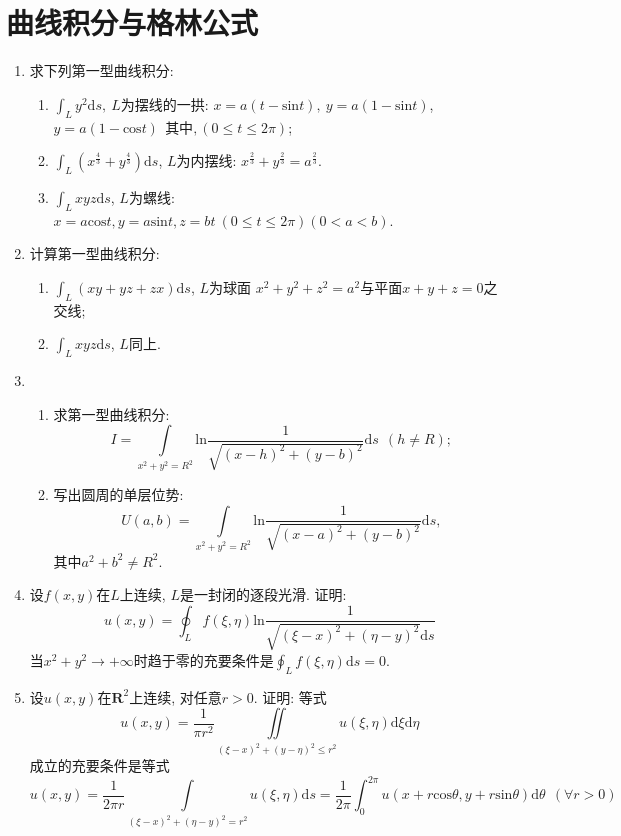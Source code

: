 \section{曲线积分与格林公式}
\begin{enumerate}
	\item 求下列第一型曲线积分:
	\begin{enumerate}
		\item $\displaystyle{\int_{L}y^2\mathrm{d}s,\ L}$为摆线的一拱: $x=a(t-\mathrm{sin}t),\  y=a(1-\mathrm{sin}t)$,\  $y=a(1-\mathrm{cos}t)\ \  
	\text{其中},(0\le t\le 2\pi)$;
		\item $\displaystyle{\int_{L}(x^{\frac{4}{3}}+y^{\frac{4}{3}})\mathrm{d}s}$, $L$为内摆线: $x^{\frac{2}{3}}+y^{\frac{2}{3}}=a^{\frac{2}{3}}$.
		\item $\displaystyle{\int_{L}xyz\mathrm{d}s}$, $L$为螺线: $x=a\mathrm{cos}t, y=a\mathrm{sin}t, z=bt\ (0\le t \le 2\pi)(0<a<b)$.
	\end{enumerate}
\item 计算第一型曲线积分:
\begin{enumerate}
	\item $\displaystyle{\int_{L}(xy+yz+zx)\mathrm{d}s}$, $L$为球面 $x^2+y^2+z^2=a^2$与平面$x+y+z=0$之交线;
		\item $\displaystyle{\int_{L}xyz\mathrm{d}s}$, $L$同上.
\end{enumerate}
\item 
\begin{enumerate}
	\item 求第一型曲线积分:$$
	I = \displaystyle{\int\limits_{x^2+y^2=R^2}\mathrm{ln}\frac{1}{\sqrt{(x-h)^2+(y-b)^2}}\mathrm{d}s\ \ (h\ne R)};$$
	\item 写出圆周的单层位势:
	$$ U(a,b) = \displaystyle{\int\limits_{x^2+y^2=R^2}\mathrm{ln}\frac{1}{\sqrt{(x-a)^2+(y-b)^2}}\mathrm{d}s},$$
	其中$a^2+b^2\ne R^2$.
\end{enumerate}
\item 设$f(x,y)$在$L$上连续, $L$是一封闭的逐段光滑. 证明:
$$ u(x,y) = \oint_{L} f(\xi,\eta)\mathrm{ln}\frac{1}{\sqrt{(\xi-x)^2+(\eta-y)^2}\mathrm{d}s}$$
当$x^2+y^2\rightarrow +\infty$时趋于零的充要条件是$\oint_{L}f(\xi,\eta)\mathrm{d}s=0$.
\item 设$u(x,y)$在$\bm{R}^2$上连续, 对任意$r>0$. 证明: 等式
$$ u(x,y) = \frac{1}{\pi r^2}\displaystyle{\iint\limits_{(\xi-x)^2+(y-\eta)^2\le r^2}u(\xi,\eta)\mathrm{d}\xi\mathrm{d}\eta}$$
成立的充要条件是等式
$$ u(x,y) = \frac{1}{2\pi r}\displaystyle{\int\limits_{(\xi-x)^2+(\eta-y)^2=r^2}u(\xi,\eta)\mathrm{d}s=\frac{1}{2\pi}\int_{0}^{2\pi}u(x+r\mathrm{cos}\theta,y+r\mathrm{sin}\theta)\mathrm{d}\theta}\ \ (\forall r>0)$$

\end{enumerate}
